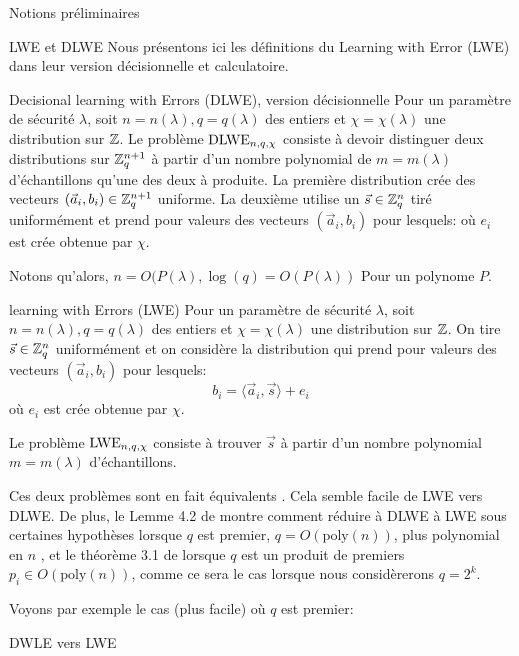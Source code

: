 \begin{section}{Notions préliminaires}
	\begin{subsection}{LWE et DLWE}
	Nous présentons ici les définitions du Learning with Error
	(LWE) dans leur version décisionnelle et calculatoire.
	
	\begin{definition}{Decisional learning with Errors (DLWE), version décisionnelle}
	Pour un paramètre de sécurité $\lambda$, soit $n = n(\lambda),q = q(\lambda)$ 
	des entiers et $\chi = \chi(\lambda)$ une
	distribution sur $\mathbb{Z}$.
	Le problème $\text{DLWE}_{n,q,\chi}$ consiste à devoir distinguer 
	deux distributions sur $\mathbb{Z}_q^{n+1}$ à partir d'un nombre polynomial
	de $m = m(\lambda)$ d'échantillons qu'une des deux à produite.
	La première distribution crée des vecteurs $(\vec{a}_i,b_i) \in
	\mathbb{Z}_q^{n+1}$ uniforme.
	La deuxième utilise un $\vec{s} \in \mathbb{Z}_q^n$ tiré uniformément et 
	prend pour valeurs des vecteurs $(\vec{a}_i, b_i)$ pour lesquels:
	où $e_i$ est crée obtenue par $\chi$.
	\end{definition}
	Notons qu'alors, $n = O(P(\lambda), \log(q) = O(P(\lambda))$ 
	Pour un polynome $P$.

	\begin{definition}{learning with Errors (LWE)}
	Pour un paramètre de sécurité $\lambda$, soit $n = n(\lambda),q = q(\lambda)$ 
	des entiers et $\chi = \chi(\lambda)$ une
	distribution sur $\mathbb{Z}$. On tire $\vec{s} \in \mathbb{Z}_q^n$ uniformément 
	et on considère la distribution qui  
	prend pour valeurs des vecteurs $(\vec{a}_i, b_i)$ pour lesquels:
		\[ b_i = \langle \vec{a}_i, \vec{s} \rangle + e_i \]
	où $e_i$ est crée obtenue par $\chi$.

	Le problème $\text{LWE}_{n,q,\chi}$ consiste à trouver $\vec{s}$ à partir d'un nombre
	polynomial $m = m(\lambda)$ d'échantillons.
	\end{definition}

	Ces deux problèmes sont en fait \og équivalents \fg. Cela semble facile
	de LWE vers DLWE. De plus, 
	le Lemme 4.2 de \cite{STOC:Regev05} montre comment réduire à
	DLWE à LWE sous certaines hypothèses lorsque $q$ est premier,
	$q = O(\text{poly}(n))$, plus
	polynomial en $n$ , et 
	le théorème 3.1 de \cite{EPRINT:MicPei11} lorsque $q$ est un produit 
	de premiers $p_i \in O(\text{poly}(n))$, comme ce sera le cas lorsque 
	nous considèrerons 
	$q = 2^k$.

	Voyons par exemple le cas (plus facile) où $q$ est premier:

	\begin{prop}{DWLE vers LWE}


\end{prop}
\end{subsection}
\end{section}

